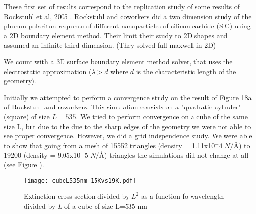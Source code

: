 
These first set of results correspond to the replication study of some results 
of Rockstuhl et al, 2005 \cite{rockstuhl2005}. Rockstuhl and coworkers did a two dimension 
study of the phonon-polariton response of different nanoparticles of silicon carbide (SiC)
using a 2D boundary element method. Their limit their study to 2D shapes and assumed an infinite
third dimension. (They solved full maxwell in 2D)


We count with a 3D surface boundary element method solver, that uses the electrostatic approximation
($\lambda > d$ where $d$ is the characteristic length of the geometry). 

Initially we attempted to perform a convergence study on the result of Figure 18a
of Rockstuhl and coworkers. This simulation consists on a "quadratic cylinder" (square)
of size $L=535$. We tried to perform convergence on a cube of the same size L, but
due to the due to the sharp edges of the geometry we were not able to see proper convergence. 
However, we did a grid independence study. We were able to show that going from a mesh of 15552 
triangles (density = 1.11x10$^-4$ $N/\text{\AA}$) to 19200 (density = 9.05x10$^-5$ $N/\text{\AA}$) 
triangles the simulations did not change at all (see Figure ).  

\begin{figure}
    \centering
    \texttt{[image: cubeL535nm\_15Kvs19K.pdf]} 
    \caption{Extinction cross section divided by $L^2$ as a function fo wavelength divided by $L$ of
    a cube of size L=535 nm}
    \label{fig:cube535}
 \end{figure}
